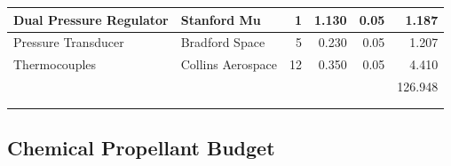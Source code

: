 \documentclass[conference]{IEEEtran}
\begin{document}
\begin{table}
{\begin{tabular}{|l|l|r|r|r|r|}
\hline
Dual Pressure Regulator                                      & {\cellcolor[rgb]{1,0.831,0.541}}Stanford Mu       & 1                    & 1.130                                                                                             & 0.05                 & 1.187                                                                                           \\ 
\hline
Pressure Transducer                                          & {\cellcolor[rgb]{1,0.831,0.541}}Bradford Space    & 5                    & 0.230                                                                                             & 0.05                 & 1.207                                                                                           \\ 
\hline
Thermocouples                                                & {\cellcolor[rgb]{1,0.831,0.541}}Collins Aerospace & 12                   & 0.350                                                                                             & 0.05                 & 4.410                                                                                           \\ 
\hline
\rowcolor[rgb]{0.773,0.851,0.941} \multicolumn{1}{|l}{Total} & \multicolumn{1}{l}{}                              & \multicolumn{1}{r}{} & \multicolumn{1}{r}{}                                                                              &                      & 126.948                                                                                         \\ 
\hline
\multicolumn{1}{l}{}                                         & \multicolumn{1}{l}{}                              & \multicolumn{1}{r}{} & \multicolumn{1}{r}{}                                                                              & \multicolumn{1}{r}{} & \multicolumn{1}{r}{}                                                                            \\
\multicolumn{1}{l}{}                                         & \multicolumn{1}{l}{}                              & \multicolumn{1}{r}{} & \multicolumn{1}{r}{}                                                                              & \multicolumn{1}{r}{} & \multicolumn{1}{r}{}                                                                           
\end{tabular}
}
\end{table}

\subsection{Chemical Propellant Budget}
\end{document}
